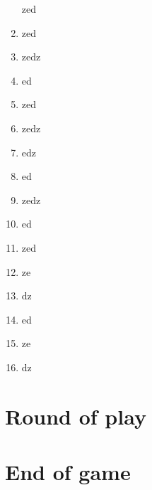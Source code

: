 \documentclass{article}%
\begin{document}
\begin{enumerate}
 zed
%
\item%
 zed
%
\item%
 zedz
%
\item%
 ed
%
\item%
 zed
%
\item%
 zedz
%
\item%
 edz
%
\item%
 ed
%
\item%
 zedz
%
\item%
 ed
%
\item%
 zed
%
\item%
 ze
%
\item%
 dz
%
\item%
 ed
%
\item%
 ze
%
\item%
 dz
%
\end{enumerate}

%
\section{ Round of play
}%
\label{sec:Roundofplay}%

%
\section{ End of game}%
\label{sec:Endofgame}%

%
\end{document}
